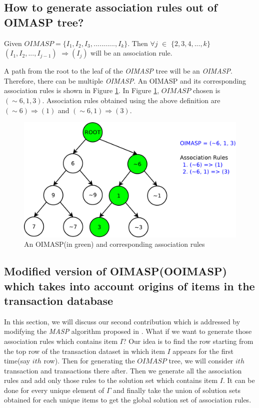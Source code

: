 \documentclass[preprint]{elsarticle}
\begin{document}
\subsection{How to generate association rules out of OIMASP tree?}
\begin{rmk}
	Given $ OIMASP = \{I_{1}, I_{2}, I_{3}, ..........., I_{k}\} $. Then $ \forall j $ $ \in $ $ \lbrace 2, 3, 4, 		..., k \rbrace $ $ (I_{1}, I_{2}, ..., I_{j-1})$ $ \Rightarrow (I_{j}) $ will be an association rule.		
\end{rmk}

A path from the root to the leaf of the \emph{OIMASP} tree will be an \emph{OIMASP}. Therefore, there can be multiple \emph{OIMASP}. An OIMASP and its corresponding association rules is shown in Figure \ref{Fig 7}. In Figure \ref{Fig 7}, $ OIMASP $ chosen is $ (\sim 6, 1, 3) $. Association rules obtained using the above definition are 
$ (\sim 6) \Rightarrow (1) $ and $ (\sim 6, 1) \Rightarrow (3) $.

\begin{figure}
\begin{center}
\includegraphics[scale=0.35]{pdf/oimasp}
\end{center}
\caption{An OIMASP(in green) and corresponding association rules}
\label{Fig 7}
\end{figure}

\subsection{Modified version of OIMASP(OOIMASP) which takes into account origins of items in the transaction database}
In this section, we will discuss our second contribution which is addressed by modifying the \emph{MASP} algorithm proposed in \cite{oldmasp}. What if we want to generate those association rules which contains item $ I $? Our idea is to find the row starting from the top row of the transaction dataset in which item $ I $ appears for the first time(say $ ith $ row). Then for generating the $ OIMASP $ tree, we will consider $ ith $ transaction and transactions there after. Then we generate all the association rules and add only those rules to the solution set which contains item $ I $. It can be done for every unique element of $ \Gamma $ and finally take the union of solution sets obtained for each unique items to get the global solution set of association rules.
\end{document}
